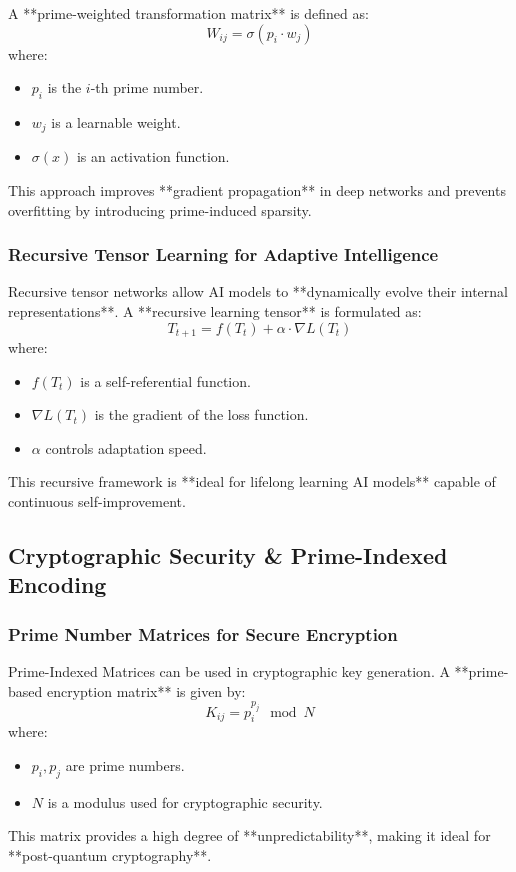 \documentclass{article}
\theoremstyle{plain}
\begin{document}
A **prime-weighted transformation matrix** is defined as:
\begin{equation}
    W_{ij} = \sigma \left( p_i \cdot w_j \right)
\end{equation}
where:
\begin{itemize}
    \item \( p_i \) is the \( i \)-th prime number.
    \item \( w_j \) is a learnable weight.
    \item \( \sigma(x) \) is an activation function.
\end{itemize}
This approach improves **gradient propagation** in deep networks and prevents overfitting by introducing prime-induced sparsity.

\subsubsection{Recursive Tensor Learning for Adaptive Intelligence}
Recursive tensor networks allow AI models to **dynamically evolve their internal representations**. A **recursive learning tensor** is formulated as:
\begin{equation}
    T_{t+1} = f(T_t) + \alpha \cdot \nabla L(T_t)
\end{equation}
where:
\begin{itemize}
    \item \( f(T_t) \) is a self-referential function.
    \item \( \nabla L(T_t) \) is the gradient of the loss function.
    \item \( \alpha \) controls adaptation speed.
\end{itemize}
This recursive framework is **ideal for lifelong learning AI models** capable of continuous self-improvement.

\subsection{Cryptographic Security \& Prime-Indexed Encoding}

\subsubsection{Prime Number Matrices for Secure Encryption}
Prime-Indexed Matrices can be used in cryptographic key generation. A **prime-based encryption matrix** is given by:
\begin{equation}
    K_{ij} = p_i^{p_j} \mod N
\end{equation}
where:
\begin{itemize}
    \item \( p_i, p_j \) are prime numbers.
    \item \( N \) is a modulus used for cryptographic security.
\end{itemize}
This matrix provides a high degree of **unpredictability**, making it ideal for **post-quantum cryptography**.
\end{document}
